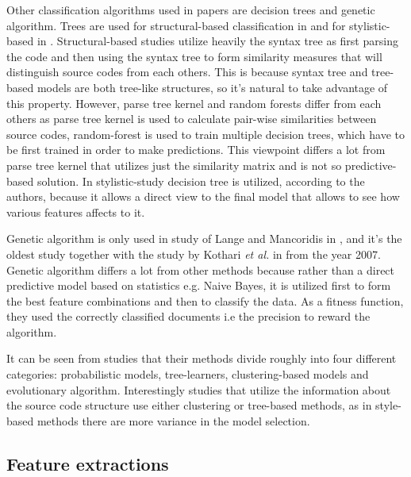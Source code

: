 \documentclass[english]{tktltiki2}
\theoremstyle{definition}
\theoremstyle{remark}
\begin{document}
Other classification algorithms used in papers are decision trees and genetic algorithm. Trees are used for structural-based classification in \cite{Son:2013:APS:2508269.2508323, caliskan2015anonymizing} and for stylistic-based in \cite{Elenbogen:2008:DOS:1295109.1295123}. Structural-based studies utilize heavily the syntax tree as first parsing the code and then using the syntax tree to form similarity measures that will distinguish source codes from each others. This is because syntax tree and tree-based models are both tree-like structures, so it's natural to take advantage of this property. However, parse tree kernel and random forests differ from each others as parse tree kernel is used to calculate pair-wise similarities between source codes, random-forest is used to train multiple decision trees, which have to be first trained in order to make predictions. This viewpoint differs a lot from parse tree kernel that utilizes just the similarity matrix and is not so predictive-based solution. In stylistic-study decision tree is utilized, according to the authors, because it allows a direct view to the final model that allows to see how various features affects to it. 

Genetic algorithm is only used in study of Lange and Mancoridis in \cite{lange2007using}, and it's the oldest study together with the study by Kothari \textit{et al.} in \cite{kothari2007probabilistic} from the year 2007. Genetic algorithm differs a lot from other methods because rather than a direct predictive model based on statistics e.g. Naive Bayes, it is utilized first to form the best feature combinations and then to classify the data. As a fitness function, they used the correctly classified documents i.e the precision to reward the algorithm.

It can be seen from studies that their methods divide roughly into four different categories: probabilistic models, tree-learners, clustering-based models and evolutionary algorithm. Interestingly studies that utilize the information about the source code structure use either clustering or tree-based methods, as in style-based methods there are more variance in the model selection. %


\subsection{Feature extractions}
\end{document}
